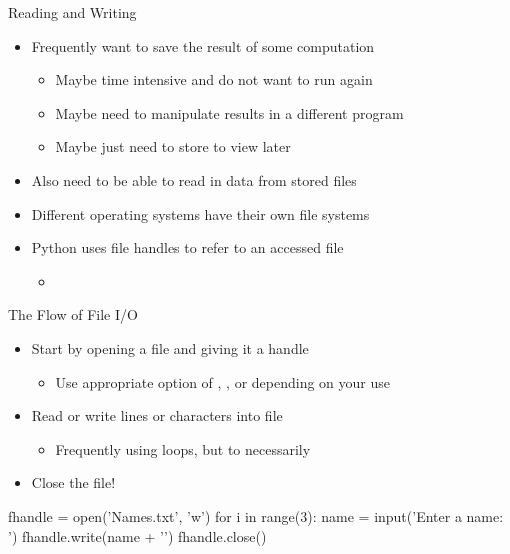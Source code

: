 \documentclass[pdf, aspectratio=169, 12pt]{beamer}
\begin{document}
\begin{frame}{Reading and Writing}
	\begin{itemize}
		\item<1-> Frequently want to save the result of some computation
			\begin{itemize}
				\item Maybe time intensive and do not want to run again
				\item Maybe need to manipulate results in a different program
				\item Maybe just need to store to view later
			\end{itemize}
		\item<2->Also need to be able to read in data from stored files
		\item<3-> Different operating systems have their own file systems
		\item<4-> Python uses \alert{file handles} to refer to an accessed file
			\begin{itemize}
				\item {}
			\end{itemize}
	\end{itemize}
\end{frame}

\begin{frame}[fragile]{The Flow of File I/O}
		\begin{itemize}
			\item Start by opening a file and giving it a handle
				\begin{itemize}
					\item Use appropriate option of , , or  depending on your use
				\end{itemize}
			\item Read or write lines or characters into file
				\begin{itemize}
					\item Frequently using loops, but to necessarily
				\end{itemize}
			\item Close the file!
		\end{itemize}
		\vspace{5mm}

		\begin{pythoncode}
			fhandle = open('Names.txt', 'w')
			for i in range(3):
				name = input('Enter a name: ')
				fhandle.write(name + '\n')
			fhandle.close()
		\end{pythoncode}
\end{frame}
\end{document}
